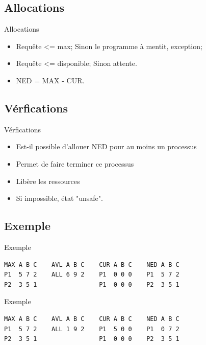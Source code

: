 \begin{frame}{\sectitle}
    \def\subsectitle{Allocations}
    \subsection{\subsectitle}
    \begin{block}{\subsectitle}
        \begin{itemize}
            \item Requête <= max; Sinon le programme à mentit, exception;
            \item Requête <= disponible; Sinon attente.
            \item NED = MAX - CUR.
        \end{itemize}
    \end{block}

    \def\subsectitle{Vérfications}
    \subsection{\subsectitle}
    \begin{block}{\subsectitle}
        \begin{itemize}
            \item Est-il possible d'allouer NED pour au moins un processus 
            \item Permet de faire terminer ce processus
            \item Libère les ressources
            \item Si impossible, état "unsafe". 
        \end{itemize}
    \end{block} 
\end{frame}

\begin{frame}[containsverbatim]{\sectitle}
\def\subsectitle{Exemple}
\subsection{\subsectitle}
\begin{exampleblock}{\subsectitle}
\begin{verbatim}
MAX A B C    AVL A B C    CUR A B C    NED A B C
P1  5 7 2    ALL 6 9 2    P1  0 0 0    P1  5 7 2
P2  3 5 1                 P1  0 0 0    P2  3 5 1
\end{verbatim}
\end{exampleblock}

\begin{exampleblock}{\subsectitle}
\begin{verbatim}
MAX A B C    AVL A B C    CUR A B C    NED A B C
P1  5 7 2    ALL 1 9 2    P1  5 0 0    P1  0 7 2
P2  3 5 1                 P1  0 0 0    P2  3 5 1
\end{verbatim}
\end{exampleblock}

\end{frame}



